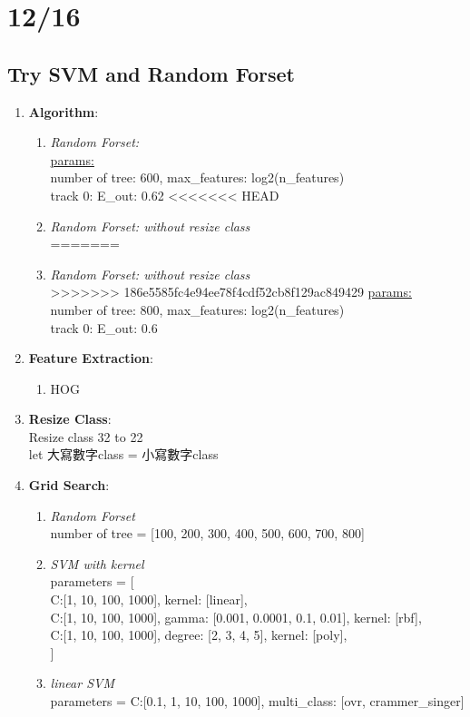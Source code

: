 \documentclass[12pt]{article}
\theoremstyle{definition}
\theoremstyle{remark}
\begin{document}
\section{12/16}
\subsection{Try SVM and Random Forset}
\begin{enumerate}
  \item \textbf{Algorithm}:
      \begin{enumerate}
          \item {\em Random Forset:\/} \\
            \underline{params:} \\
            number of tree: 600, max\_features: log2(n\_features)\\
            {\color{red}track 0: E\_out: 0.62}
<<<<<<< HEAD
          \item {\em Random Forset: without resize class \/} \\
=======
          \item {\em Random Forset:\/ without resize class} \\
>>>>>>> 186e5585fc4e94ee78f4cdf52cb8f129ac849429
            \underline{params:} \\
            number of tree: 800, max\_features: log2(n\_features)\\
            {\color{red}track 0: E\_out: 0.6}
      \end{enumerate}
    \item \textbf{Feature Extraction}:
      \begin{enumerate}
        \item HOG
      \end{enumerate}
    \item \textbf{Resize Class}:\\
      Resize class 32 to 22\\
      let 大寫數字class =  小寫數字class
    \item \textbf{Grid Search}:
      \begin{enumerate}
        \item {\em Random Forset\/} \\
          number of tree = [100, 200, 300, 400, 500, 600, 700, 800]
        \item {\em SVM with kernel\/}\\
        parameters = [ \\
          {C:[1, 10, 100, 1000], kernel: [linear]},\\
          {C:[1, 10, 100, 1000], gamma: [0.001, 0.0001, 0.1, 0.01], kernel: [rbf]},\\
          {C:[1, 10, 100, 1000], degree: [2, 3, 4, 5], kernel: [poly]}, \\
        ]
        \item {\em linear SVM\/}\\
        parameters = {C:[0.1, 1, 10, 100, 1000], multi\_class: [ovr, crammer\_singer]}
      \end{enumerate}
\end{enumerate}
\end{document}
